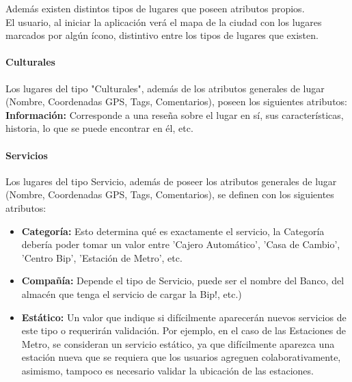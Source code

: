 \documentclass[10pt,letterpaper]{article}
\begin{document}
Además existen distintos tipos de lugares que poseen atributos propios.\\

El usuario, al iniciar la aplicación verá el mapa de la ciudad con los lugares marcados por algún ícono, distintivo entre los tipos de lugares que existen.\\

\paragraph{Culturales}

Los lugares del tipo "Culturales", además de los atributos generales de lugar (Nombre, Coordenadas GPS, Tags, Comentarios), poseen los siguientes atributos:\\

\textbf{Información:} Corresponde a una reseña sobre el lugar en sí, sus características, historia, lo que se puede encontrar en él, etc.\\

\paragraph{Servicios}

Los lugares del tipo Servicio, además de poseer los atributos generales de lugar (Nombre, Coordenadas GPS, Tags, Comentarios), se definen con los siguientes atributos:\\

\begin{itemize}
 \item \textbf{Categoría:} Esto determina qué es exactamente el servicio, la Categoría debería poder tomar un valor entre 'Cajero Automático', 'Casa de Cambio', 'Centro Bip', 'Estación de Metro', etc.\\

 \item \textbf{Compañía:} Depende el tipo de Servicio, puede ser el nombre del Banco, del almacén que tenga el servicio de cargar la Bip!, etc.)\\

 \item \textbf{Estático:} Un valor que indique si difícilmente aparecerán nuevos servicios de este tipo o requerirán validación. Por ejemplo, en el caso de las Estaciones de Metro, se consideran un servicio estático, ya que difícilmente aparezca una estación nueva que se requiera que los usuarios agreguen colaborativamente, asimismo, tampoco es necesario validar la ubicación de las estaciones.\\
\end{itemize}
\end{document}
